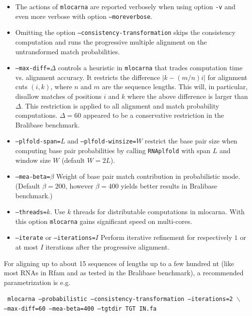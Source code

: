 \documentclass{article}
\newenvironment{ttbox}{%
  \begin{framed}\begin{minipage}{1.0\textwidth}\tt}%
{\end{minipage}\end{framed}}
\begin{document}
\begin{itemize}
\item The actions of \texttt{mlocarna} are reported verbosely when
  using option \texttt{-v} and even more verbose with option
  \texttt{--moreverbose}.
\item Omitting the option \texttt{--consistency-transformation} skips the
consistency computation and runs the progressive multiple alignment on
the untransformed match probabilities.
\item \texttt{--max-diff=$\Delta$} controls a heuristic in
  \texttt{mlocarna} that trades computation time vs. alignment
  accuracy. It restricts the difference $|k-(m/n)i|$ for alignment
  cuts $(i,k)$, where $n$ and $m$ are the sequence lengths.  This
  will, in particular, disallow matches of positions $i$ and $k$ where
  the above difference is larger than $\Delta$. This restriction is
  applied to all alignment and match probability
  computations. $\Delta=60$ appeared to be a conservative restriction
  in the Bralibase benchmark.
\item \texttt{--plfold-span=$L$} and \texttt{--plfold-winsize=$W$}
  restrict the base pair size when computing base pair probabilities
  by calling \texttt{RNAplfold} with span $L$ and window size $W$
  (default $W=2L$).
\item \texttt{--mea-beta=$\beta$} Weight of base pair match
  contribution in probabilistic mode. (Default $\beta=200$,
  however $\beta=400$ yields better results in Bralibase benchmark.)
\item \texttt{--threads=$k$}. Use $k$ threads for distributable
  computations in mlocarna. With this option \texttt{mlocarna} gains
  significant speed on multi-cores.
\item \texttt{--iterate} or \texttt{--iterations=$I$} Perform
  iterative refinement for respectively $1$ or at most $I$ iterations
  after the progressive alignment.
\end{itemize}

For aligning up to about 15 sequences of lengths up to a few hundred nt (like most
RNAs in Rfam and as tested in the Bralibase benchmark), a recommended parametrization is e.g.
\begin{ttbox}
  mlocarna --probabilistic --consistency-transformation --iterations=2 $\backslash$ \\
  \hphantom{mlocarna} --max-diff=60 --mea-beta=400 %
  --tgtdir TGT IN.fa
\end{ttbox}
\end{document}
